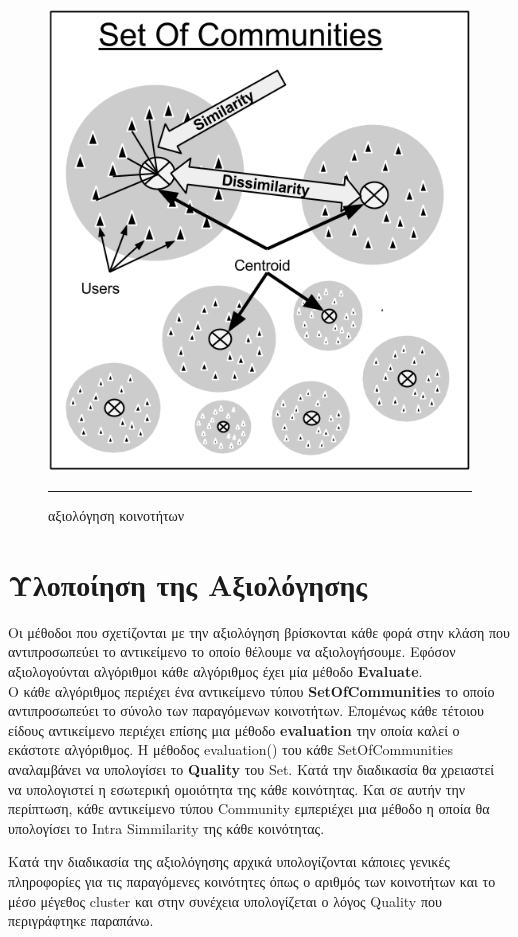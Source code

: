 \begin{figure}[htbp]
  \hspace{-7.5em}  
    \includegraphics[scale=0.80]{Figures/evaluation_flow.png}
	\rule{35em}{0.5pt}  %
	\caption[evaluation_flow]{αξιολόγηση κοινοτήτων}
  \label{fig:evaluation_flow}  
\end{figure}




\section{Υλοποίηση της Αξιολόγησης}
\label{eval}
\noindent
Οι μέθοδοι που σχετίζονται με την αξιολόγηση βρίσκονται κάθε φορά στην κλάση που αντιπροσωπεύει το αντικείμενο το οποίο θέλουμε να αξιολογήσουμε. 
Εφόσον αξιολογούνται αλγόριθμοι κάθε αλγόριθμος έχει μία μέθοδο \textbf{Evaluate}.\\
Ο κάθε αλγόριθμος περιέχει ένα αντικείμενο τύπου \textbf{SetOfCommunities} το 
οποίο αντιπροσωπεύει το σύνολο των παραγόμενων κοινοτήτων. Επομένως κάθε τέτοιου είδους αντικείμενο περιέχει επίσης μια μέθοδο \textbf{evaluation} την οποία καλεί ο εκάστοτε αλγόριθμος.
Η μέθοδος evaluation() του κάθε SetOfCommunities αναλαμβάνει να υπολογίσει το \textbf{Quality} του Set. 
Κατά την διαδικασία θα χρειαστεί να υπολογιστεί η εσωτερική ομοιότητα της κάθε κοινότητας. 
Και σε αυτήν την περίπτωση, κάθε αντικείμενο τύπου Community εμπεριέχει μια μέθοδο η οποία θα υπολογίσει το Intra Simmilarity της κάθε κοινότητας.


Κατά την διαδικασία της αξιολόγησης αρχικά υπολογίζονται κάποιες γενικές πληροφορίες για τις παραγόμενες κοινότητες όπως ο αριθμός των κοινοτήτων και το μέσο μέγεθος cluster 
και στην συνέχεια υπολογίζεται ο λόγος Quality που περιγράφτηκε παραπάνω.